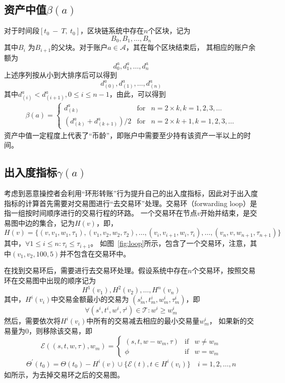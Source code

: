 \subsection{资产中值$\beta(a)$}
对于时间段$[t_0\ −\ T,\ t_0]$，区块链系统中存在$n$个区块，记为
\[
B_0, B_1, \dots, B_n
\]
\noindent 其中$B_{i}$ 为$B_{i+1}$的父块。对于账户$a \in \mathcal{A}$，其在每个区块结束后，
其相应的账户余额为
\[
d^a_0, d^a_1, \dots, d^a_n
\]
上述序列按从小到大排序后可以得到
\[
d^a_{(0)}, d^a_{(1)}, \dots, d^a_{(n)}
\]
其中$d^a_{(i)} < d^a_{(i+1)}, 0\le i \le {n-1}$，由此，可以得到
\begin{align}
\beta(a) = \left\{ \begin{array}{rcl}
{d^a_{(k)}} & \mbox{for} & n=2\times{}k, k=1, 2, 3, \ldots \\
{(d^a_{(k)} + d^a_{(k+1)})/2} & \mbox{for} & n=2\times{}k + 1, k=1, 2, 3, \ldots
\end{array}\right.
\end{align}
资产中值一定程度上代表了“币龄”，即账户中需要至少持有该资产一半以上的时间。

\subsection{出入度指标$\gamma(a)$}
考虑到恶意操控者会利用“环形转账”行为提升自己的出入度指标，因此对于出入度指标的计算首先需要对交易图进行“去交易环”处理。交易环（forwarding loop）是指一组按时间顺序进行的交易行程的环路。
一个交易环在节点$v$开始并结束，是交易图中边的集合，记为$H(v)$，即，
\[
H(v) = \{(v, v_1, w_1, \tau_1), (v_1, v_2, w_2, \tau_2), \dots, (v_i, v_{i+1}, w_{i}, \tau_i), \dots, (v_n, v, w_{n+1}, \tau_{n+1})\}
\]
\noindent 其中，$\forall 1\le i \le n : \tau_i \le \tau_{i+1} $。
\noindent 如图~\ref{fig:loop}所示，包含了一个交易环，注意，其中$(v_1, v_2, 100, 5)$并不包含在交易环中。




在找到交易环后，需要进行去交易环处理。假设系统中存在$n$个交易环，按照交易环在交易图中出现的顺序记为
\[
H^1(v_1), H^2(v_2), \dots, H^n(v_n)\]
\noindent 其中，$H^i(v_i)$中交易金额最小的交易为 $(s^i_m, t^i_m, w^i_m, \tau^i_m)$，即
\[
\forall (s^i, t^i, w^i, \tau^i) \in \mathcal{T} : w^i \ge w^i_m
\]
\noindent 然后，需要依次将$H^i(v_i)$中所有的交易减去相应的最小交易量$w^i_m$，
如果新的交易量为0，则移除该交易，即
\[
\mathcal{E}((s, t, w, \tau), w_m) = \left\{ \begin{array}{rcl}
(s, t, w-w_m, \tau) & \mbox{if} & w \ne w_m \\
\phi & \mbox{if} & w = w_m
\end{array}\right.
\]
\begin{align}
\Theta^{\prime}(t_0)=\Theta(t_0)-H^i(v) \cup \{\mathcal{E}(t), t\in H^i(v_i)\} \quad i = 1, 2,\dots, n
\end{align}
\noindent 如所示，为去掉交易环之后的交易图。


